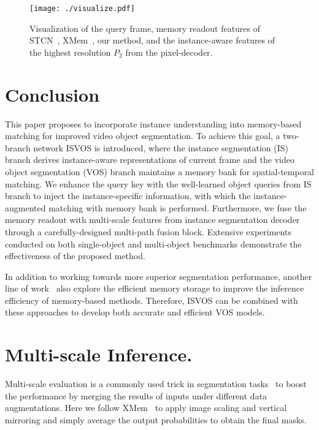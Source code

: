 \documentclass[10pt,twocolumn,letterpaper]{article}
\newcommand{\system}{ISVOS\xspace}
\begin{document}
\begin{figure}[!ht]
  \centering
   \texttt{[image: ./visualize.pdf]}
   \vspace{-0.15in}
   \caption{Visualization of the query frame, memory readout features of STCN~\cite{cheng2021stcn}, XMem~\cite{cheng2022xmem}, our method, and the instance-aware features of the highest resolution $P_{2}$ from the pixel-decoder.}
   \label{fig:visualization}
\end{figure}

\section{Conclusion}
\label{sec:conclusion}
This paper proposes to incorporate instance understanding into memory-based matching for improved video object segmentation. To achieve this goal, a two-branch network \system is introduced, where the instance segmentation (IS) branch derives instance-aware representations of current frame and the video object segmentation (VOS) branch maintains a memory bank for spatial-temporal matching. We enhance the query key with the well-learned object queries from IS branch to inject the instance-specific information, with which the instance-augmented matching with memory bank is performed. Furthermore, we fuse the memory readout with multi-scale features from instance segmentation decoder through a carefully-designed multi-path fusion block. Extensive experiments conducted on both single-object and multi-object benchmarks demonstrate the effectiveness of the proposed method.

In addition to working towards more superior segmentation performance, another line of work~\cite{liang2020video,xie2021efficient,xu2022accelerating} also explore the efficient memory storage to improve the inference efficiency of memory-based methods. Therefore, \system can be combined with these approaches to develop both accurate and efficient VOS models.

{\small


}
\appendix
\section{Multi-scale Inference.}
Multi-scale evaluation is a commonly used trick in segmentation tasks~\cite{chandra2016fast,cheng2021stcn,cheng2022xmem} to boost the performance by merging the results of inputs under different data augmentations. Here we follow XMem~\cite{cheng2022xmem} to apply image scaling and vertical mirroring and simply
average the output probabilities to obtain the final masks. 
\end{document}

